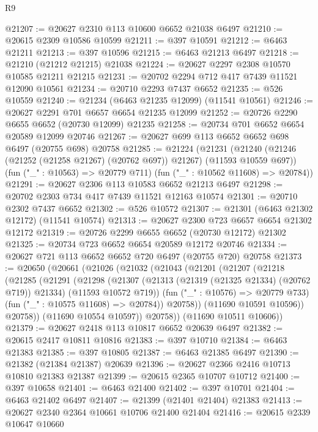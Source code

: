 \begin{lexlean}{R9}
\begin{coremodule}
@21207 := @20627 @2310 @113 @10600 @6652 @21038 @6497
@21210 := @20615 @2309 @10586 @10599
@21211 := @397 @10591
@21212 := @6463 @21211
@21213 := @397 @10596
@21215 := @6463 @21213 @6497
@21218 := @21210 (@21212 @21215) @21038
@21224 := @20627 @2297 @2308 @10570 @10585 @21211 @21215
@21231 := @20702 @2294 @712 @417 @7439 @11521 @12090 @10561
@21234 := @20710 @2293 @7437 @6652
@21235 := @526 @10559
@21240 := @21234 (@6463 @21235 @12099) (@11541 @10561)
@21246 := @20627 @2291 @701 @6657 @6654 @21235 @12099
@21252 := @20726 @2290 @6655 @6652 (@20730 @12099) @21235
@21258 := @20734 @701 @6652 @6654 @20589 @12099 @20746
@21267 := @20627 @699 @113 @6652 @6652 @698 @6497 (@20755 @698) @20758
@21285 := @21224
    (@21231
      (@21240 (@21246 (@21252 (@21258 @21267) (@20762 @697)) @21267) (@11593 @10559 @697))
      (fun ("_" : @10563) => @20779 @711)
      (fun ("_" : @10562 @11608) => @20784))
@21291 := @20627 @2306 @113 @10583 @6652 @21213 @6497
@21298 := @20702 @2303 @734 @417 @7439 @11521 @12163 @10574
@21301 := @20710 @2302 @7437 @6652
@21302 := @526 @10572
@21307 := @21301 (@6463 @21302 @12172) (@11541 @10574)
@21313 := @20627 @2300 @723 @6657 @6654 @21302 @12172
@21319 := @20726 @2299 @6655 @6652 (@20730 @12172) @21302
@21325 := @20734 @723 @6652 @6654 @20589 @12172 @20746
@21334 := @20627 @721 @113 @6652 @6652 @720 @6497 (@20755 @720) @20758
@21373 := @20650
    (@20661
      (@21026
        (@21032
          (@21043
            (@21201
              (@21207
                (@21218
                  (@21285
                    (@21291
                      (@21298
                        (@21307
                          (@21313 (@21319 (@21325 @21334) (@20762 @719)) @21334)
                          (@11593 @10572 @719))
                        (fun ("_" : @10576) => @20779 @733)
                        (fun ("_" : @10575 @11608) => @20784))
                      @20758))
                  (@11690 @10591 @10596))
                @20758))
            (@11690 @10554 @10597))
          @20758))
      (@11690 @10511 @10606))
@21379 := @20627 @2418 @113 @10817 @6652 @20639 @6497
@21382 := @20615 @2417 @10811 @10816
@21383 := @397 @10710
@21384 := @6463 @21383
@21385 := @397 @10805
@21387 := @6463 @21385 @6497
@21390 := @21382 (@21384 @21387) @20639
@21396 := @20627 @2366 @2416 @10713 @10810 @21383 @21387
@21399 := @20615 @2365 @10707 @10712
@21400 := @397 @10658
@21401 := @6463 @21400
@21402 := @397 @10701
@21404 := @6463 @21402 @6497
@21407 := @21399 (@21401 @21404) @21383
@21413 := @20627 @2340 @2364 @10661 @10706 @21400 @21404
@21416 := @20615 @2339 @10647 @10660

\end{coremodule}
\end{lexlean}

